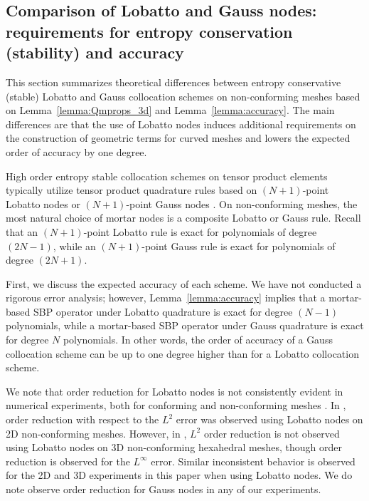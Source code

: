 \documentclass{svjour3}                     %
\begin{document}
\subsection{Comparison of Lobatto and Gauss nodes: requirements for entropy conservation (stability) and accuracy}
\label{sec:compare}

This section summarizes theoretical differences between entropy conservative (stable) Lobatto and Gauss collocation schemes on non-conforming meshes based on Lemma~\ref{lemma:Qmprops_3d} and Lemma~\ref{lemma:accuracy}.  The main differences are that the use of Lobatto nodes induces additional requirements on the construction of geometric terms for curved meshes and lowers the expected order of accuracy by one degree.  

High order entropy stable collocation schemes on tensor product elements typically utilize tensor product quadrature rules based on $(N+1)$-point Lobatto nodes \cite{carpenter2014entropy, gassner2016split} or $(N+1)$-point Gauss nodes \cite{chan2018efficient}.  On non-conforming meshes, the most natural choice of mortar nodes is a composite Lobatto or Gauss rule.  Recall that an $(N+1)$-point Lobatto rule is exact for polynomials of degree $(2N-1)$, while an $(N+1)$-point Gauss rule is exact for polynomials of degree $(2N+1)$.  

First, we discuss the expected accuracy of each scheme.  We have not conducted a rigorous error analysis; however, Lemma~\ref{lemma:accuracy} implies that a mortar-based SBP operator under Lobatto quadrature is exact for degree $(N-1)$ polynomials, while a mortar-based SBP operator under Gauss quadrature is exact for degree $N$ polynomials.  In other words, the order of accuracy of a Gauss collocation scheme can be up to one degree higher than for a Lobatto collocation scheme.  

We note that order reduction for Lobatto nodes is not consistently evident in numerical experiments, both for conforming \cite{chan2018efficient, hindenlang2019order} and non-conforming meshes \cite{fernandez2019entropy}.  In \cite{friedrich2017entropy}, order reduction with respect to the $L^2$ error was observed using Lobatto nodes on 2D non-conforming meshes.  However, in \cite{fernandez2019entropy}, $L^2$ order reduction is not observed using Lobatto nodes on 3D non-conforming hexahedral meshes, though order reduction is observed for the $L^\infty$ error.  Similar inconsistent behavior is observed for the 2D and 3D experiments in this paper when using Lobatto nodes.  We do note observe order reduction for Gauss nodes in any of our experiments.
\end{document}
